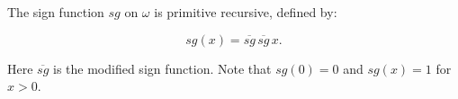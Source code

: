The sign function $sg$ on $\omega$ is primitive recursive, defined by:

$$sg(x) = \overline{sg}\,\overline{sg}\,x.$$

Here $\overline{sg}$ is the modified sign function. Note that $sg(0) = 0$ and $sg(x) = 1$ for $x > 0$.

